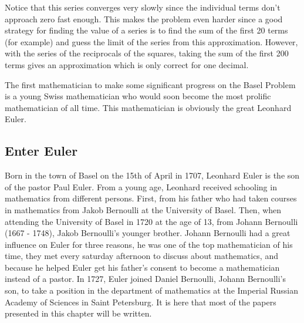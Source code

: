 Notice that this series converges very slowly since the individual terms don't approach zero fast enough. This makes the problem even harder since a good strategy for finding the value of a series is to find the sum of the first 20 terms (for example) and guess the limit of the series from this approximation. However, with the series of the reciprocals of the squares, taking the sum of the first 200 terms gives an approximation which is only correct for one decimal.

The first mathematician to make some significant progress on the Basel Problem is a young Swiss mathematician who would soon become the most prolific mathematician of all time. This mathematician is obviously the great Leonhard Euler. 

\subsection*{Enter Euler}

Born in the town of Basel on the 15th of April in 1707, Leonhard Euler is the son of the pastor Paul Euler. From a young age, Leonhard received schooling in mathematics from different persons. First, from his father who had taken courses in mathematics from Jakob Bernoulli at the University of Basel. Then, when attending the University of Basel in 1720 at the age of 13, from Johann Bernoulli (1667 - 1748), Jakob Bernoulli's younger brother. Johann Bernoulli had a great influence on Euler for three reasons, he was one of the top mathematician of his time, they met every saturday afternoon to discuss about mathematics, and because he helped Euler get his father's consent to become a mathematician instead of a pastor. In 1727, Euler joined Daniel Bernoulli, Johann Bernoulli's son, to take a position in the department of mathematics at the Imperial Russian Academy of Sciences in Saint Petersburg. It is here that most of the papers presented in this chapter will be written.


